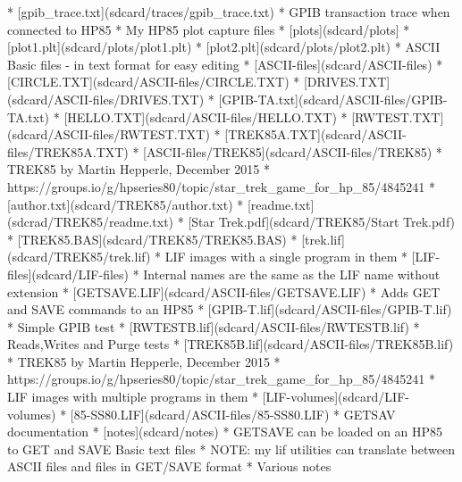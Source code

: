 \begin{DoxyItemize}
\begin{DoxyItemize}
\begin{DoxyItemize}
\begin{DoxyItemize}
\begin{DoxyItemize}
\begin{DoxyItemize}
\begin{DoxyItemize}
\begin{DoxyVerb}
    * [gpib_trace.txt](sdcard/traces/gpib_trace.txt)
      * GPIB transaction trace when connected to HP85
  * My HP85 plot capture files
    * [plots](sdcard/plots]
      * [plot1.plt](sdcard/plots/plot1.plt)
      * [plot2.plt](sdcard/plots/plot2.plt)
  * ASCII Basic files - in text format for easy editing
    * [ASCII-files](sdcard/ASCII-files)
      * [CIRCLE.TXT](sdcard/ASCII-files/CIRCLE.TXT)
      * [DRIVES.TXT](sdcard/ASCII-files/DRIVES.TXT)
      * [GPIB-TA.txt](sdcard/ASCII-files/GPIB-TA.txt)
      * [HELLO.TXT](sdcard/ASCII-files/HELLO.TXT)
      * [RWTEST.TXT](sdcard/ASCII-files/RWTEST.TXT)
      * [TREK85A.TXT](sdcard/ASCII-files/TREK85A.TXT)
      * [ASCII-files/TREK85](sdcard/ASCII-files/TREK85)
        * TREK85 by Martin Hepperle, December 2015
          * https://groups.io/g/hpseries80/topic/star_trek_game_for_hp_85/4845241
        * [author.txt](sdcard/TREK85/author.txt)  
        * [readme.txt](sdcrad/TREK85/readme.txt)    
        * [Star Trek.pdf](sdcard/TREK85/Start Trek.pdf)
        * [TREK85.BAS](sdcard/TREK85/TREK85.BAS)
        * [trek.lif](sdcard/TREK85/trek.lif)
  * LIF images with a single program in them
    * [LIF-files](sdcard/LIF-files)
      * Internal names are the same as the LIF name without extension
    * [GETSAVE.LIF](sdcard/ASCII-files/GETSAVE.LIF)
      * Adds GET and SAVE commands to an HP85
    * [GPIB-T.lif](sdcard/ASCII-files/GPIB-T.lif)
      * Simple GPIB test
    * [RWTESTB.lif](sdcard/ASCII-files/RWTESTB.lif)
      * Reads,Writes and Purge tests
    * [TREK85B.lif](sdcard/ASCII-files/TREK85B.lif)
      * TREK85 by Martin Hepperle, December 2015
        * https://groups.io/g/hpseries80/topic/star_trek_game_for_hp_85/4845241
  * LIF images with multiple programs in them
    * [LIF-volumes](sdcard/LIF-volumes)
      * [85-SS80.LIF](sdcard/ASCII-files/85-SS80.LIF)
  * GETSAV documentation
    * [notes](sdcard/notes)
      * GETSAVE can be loaded on an HP85 to GET and SAVE Basic text files
        * NOTE: my lif utilities can translate between ASCII files and files in GET/SAVE format 
    * Various notes 
\end{DoxyVerb}
 

 
\end{DoxyItemize}
\end{DoxyItemize}
\end{DoxyItemize}
\end{DoxyItemize}
\end{DoxyItemize}
\end{DoxyItemize}
\end{DoxyItemize}